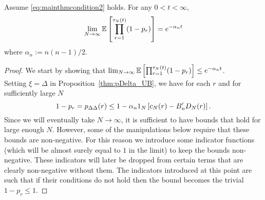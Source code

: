 \begin{lemma}\label{thm:basis}
Assume \eqref{eq:mainthmcondition2} holds.
For any $0 < t < \infty$,
\begin{equation*}
\lim_{N\to\infty} \mathbb{E}\left[ \prod_{r=1}^{\tau_N(t)} (1-p_r) \right] 
= e^{-\alpha_n t}
\end{equation*}
where $\alpha_n := n(n-1)/2$.
\end{lemma}

\begin{proof}
We start by showing that
$\lim_{N\to\infty}\mathbb{E}\left[ \prod_{r=1}^{\tau_N(t)} (1-p_r) \right] 
\leq e^{-\alpha_n t}$.\\
Setting $\xi=\Delta$ in Proposition~\ref{thm:pDelta_UB}, we have for each $r$ and for sufficiently large $N$
\begin{equation} \label{eq:018}
1-p_r
= p_{\Delta\Delta}(r) 
\leq 1 - \alpha_n \ON %
        \left[ c_N(r) - B_n^\prime D_N(r) \right] .
\end{equation}
Since we will eventually take $N\to\infty$, it is sufficient to have bounds that hold for large enough $N$. However, some of the manipulations below require that these bounds are non-negative. For this reason we introduce some indicator functions (which will be almost surely equal to $1$ in the limit) to keep the bounds non-negative.
These indicators will later be dropped from certain terms that are clearly non-negative without them. 
The indicators introduced at this point are such that if their conditions do not hold then the bound becomes the trivial $1-p_r \leq 1$.
 

\end{proof}
